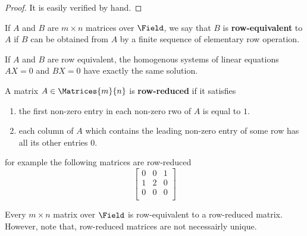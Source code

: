 \begin{proof}
    It is easily verified by hand.
\end{proof}

\begin{definition}
    If \(A\) and \(B\) are \(m \times n\) matrices over \(\Field\), we say that \(B\) is \textbf{row-equivalent} to \(A\) if \(B\) can be obtained from \(A\) by a finite sequence of elementary row operation.
\end{definition}

\begin{theorem}
    If \(A\) and \(B\) are row equivalent, the homogenous systems of linear equations \(AX = 0\) and \(BX = 0\) have exactly the same solution.
\end{theorem}

\begin{definition} 
    A matrix \(A \in \Matrices{m}{n}\)  is \textbf{row-reduced} if it satisfies
    \begin{enumerate}
        \item the first non-zero entry in each non-zero rwo of \(A\) is equal to \(1\).
        \item each column of \(A\) which contains the leading non-zero entry of some row has all its other entries \(0\).
    \end{enumerate}
\end{definition}

\begin{example}
    for example the following matrices are row-reduced
    \begin{equation*}
        \begin{bmatrix}
            0 & 0 & 1 \\
            1 & 2 & 0 \\
            0 & 0 & 0 \\
        \end{bmatrix}
    \end{equation*}
\end{example}

\begin{theorem}
    Every \(m \times n\) matrix over \(\Field\) is row-equivalent to a row-reduced matrix. However, note that, row-reduced matrices are not necessairly unique.
\end{theorem}

